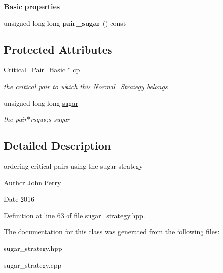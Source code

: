 \begin{Indent}{\bf Basic properties}\par
\begin{DoxyCompactItemize}
\item 
unsigned long long {\bfseries pair\+\_\+sugar} () const \hypertarget{class_pair___sugar___strategy_a619b740c5ae377ff40b51cdb2aa7e417}{}\label{class_pair___sugar___strategy_a619b740c5ae377ff40b51cdb2aa7e417}

\end{DoxyCompactItemize}
\end{Indent}
\subsection*{Protected Attributes}
\begin{DoxyCompactItemize}
\item 
\hyperlink{class_critical___pair___basic}{Critical\+\_\+\+Pair\+\_\+\+Basic} $\ast$ \hyperlink{class_pair___sugar___strategy_ac2555f4903cd2226c2238368fb457d82}{cp}\hypertarget{class_pair___sugar___strategy_ac2555f4903cd2226c2238368fb457d82}{}\label{class_pair___sugar___strategy_ac2555f4903cd2226c2238368fb457d82}

\begin{DoxyCompactList}\small\item\em the critical pair to which this {\ttfamily \hyperlink{class_normal___strategy}{Normal\+\_\+\+Strategy}} belongs \end{DoxyCompactList}\item 
unsigned long long \hyperlink{class_pair___sugar___strategy_a2fc5dc462a862b84b48fa6a9edd51b28}{sugar}\hypertarget{class_pair___sugar___strategy_a2fc5dc462a862b84b48fa6a9edd51b28}{}\label{class_pair___sugar___strategy_a2fc5dc462a862b84b48fa6a9edd51b28}

\begin{DoxyCompactList}\small\item\em the pair$\ast$rsquo;s sugar \end{DoxyCompactList}\end{DoxyCompactItemize}


\subsection{Detailed Description}
ordering critical pairs using the sugar strategy 

\begin{DoxyAuthor}{Author}
John Perry 
\end{DoxyAuthor}
\begin{DoxyDate}{Date}
2016 
\end{DoxyDate}


Definition at line 63 of file sugar\+\_\+strategy.\+hpp.



The documentation for this class was generated from the following files\+:\begin{DoxyCompactItemize}
\item 
sugar\+\_\+strategy.\+hpp\item 
sugar\+\_\+strategy.\+cpp\end{DoxyCompactItemize}
